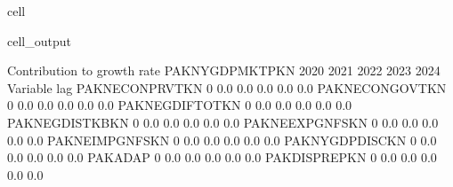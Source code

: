 \documentclass[letterpaper,10pt,english]{jupyterBook}
\begin{document}
\begin{sphinxuseclass}{cell}
\begin{sphinxVerbatimOutput}
\begin{sphinxuseclass}{cell_output}
\begin{sphinxVerbatim}[commandchars=\\\{\}]
 Contribution to growth rate PAKNYGDPMKTPKN
                          2020        2021        2022        2023        2024
Variable       lag                                                            
PAKNECONPRVTKN 0          0.0\PYGZpc{}        0.0\PYGZpc{}        0.0\PYGZpc{}        0.0\PYGZpc{}        0.0\PYGZpc{}
PAKNECONGOVTKN 0          0.0\PYGZpc{}        0.0\PYGZpc{}       \PYGZhy{}0.0\PYGZpc{}        0.0\PYGZpc{}        0.0\PYGZpc{}
PAKNEGDIFTOTKN 0          0.0\PYGZpc{}        0.0\PYGZpc{}        0.0\PYGZpc{}        0.0\PYGZpc{}        0.0\PYGZpc{}
PAKNEGDISTKBKN 0          0.0\PYGZpc{}        0.0\PYGZpc{}        0.0\PYGZpc{}        0.0\PYGZpc{}        0.0\PYGZpc{}
PAKNEEXPGNFSKN 0          0.0\PYGZpc{}        0.0\PYGZpc{}        0.0\PYGZpc{}        0.0\PYGZpc{}        0.0\PYGZpc{}
PAKNEIMPGNFSKN 0         \PYGZhy{}0.0\PYGZpc{}       \PYGZhy{}0.0\PYGZpc{}       \PYGZhy{}0.0\PYGZpc{}       \PYGZhy{}0.0\PYGZpc{}       \PYGZhy{}0.0\PYGZpc{}
PAKNYGDPDISCKN 0          0.0\PYGZpc{}        0.0\PYGZpc{}        0.0\PYGZpc{}        0.0\PYGZpc{}        0.0\PYGZpc{}
PAKADAP        0         \PYGZhy{}0.0\PYGZpc{}       \PYGZhy{}0.0\PYGZpc{}       \PYGZhy{}0.0\PYGZpc{}       \PYGZhy{}0.0\PYGZpc{}       \PYGZhy{}0.0\PYGZpc{}
PAKDISPREPKN   0         \PYGZhy{}0.0\PYGZpc{}       \PYGZhy{}0.0\PYGZpc{}       \PYGZhy{}0.0\PYGZpc{}       \PYGZhy{}0.0\PYGZpc{}       \PYGZhy{}0.0\PYGZpc{}
\end{sphinxVerbatim}

\end{sphinxuseclass}\end{sphinxVerbatimOutput}

\end{sphinxuseclass}
\end{document}
